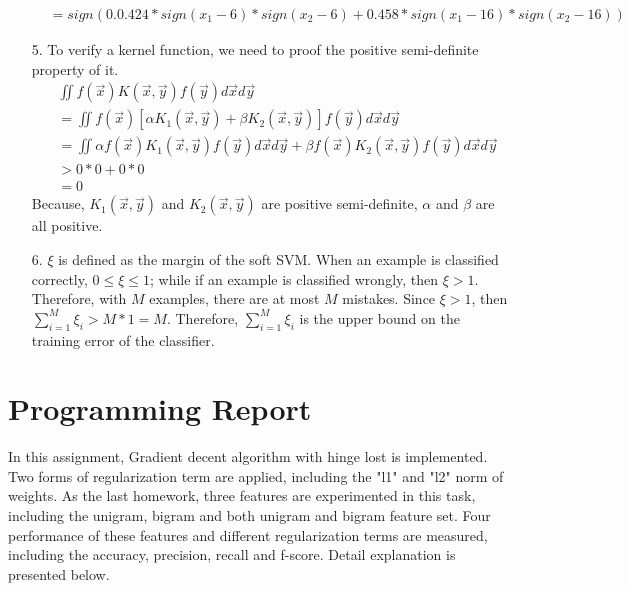 \documentclass[11pt]{article}
\begin{document}
\begin{itemize}
\begin{align*}
&= sign(0.0.424*sign(x_1-6)*sign(x_2-6) + 0.458*sign(x_1-16)*sign(x_2-16))
\end{align*}
\item[5.] To verify a kernel function, we need to proof the positive semi-definite property of it.
\begin{align*}
& \iint f(\vec{x})K(\vec{x},\vec{y})f(\vec{y})d\vec{x}d\vec{y} \\
& =\iint f(\vec{x})[\alpha K_1(\vec{x},\vec{y})+\beta K_2(\vec{x},\vec{y})]f(\vec{y})d\vec{x}d\vec{y} \\
& = \iint \alpha f(\vec{x})K_1(\vec{x},\vec{y})f(\vec{y})d\vec{x}d\vec{y} + \beta f(\vec{x})K_2(\vec{x},\vec{y})f(\vec{y})d\vec{x}d\vec{y} \\
& > 0*0 + 0*0 \\
& = 0
\end{align*}
Because, \(K_1(\vec{x},\vec{y})\) and \(K_2(\vec{x},\vec{y})\) are positive semi-definite, \(\alpha\) and \(\beta\) are all positive.
\item[6.] \(\xi\) is defined as the margin of the soft SVM. When an example is classified correctly, \(0 \leq \xi \leq 1\); while if an example is classified wrongly, then \(\xi > 1\). Therefore, with \(M\) examples, there are at most \(M\) mistakes. Since  \(\xi > 1\), then \(\sum_{i=1}^{M} \xi_i > M*1 = M\). Therefore, \(\sum_{i=1}^{M} \xi_i\) is the upper bound on the training error of the classifier.
\end{itemize}


\section{Programming Report}
In this assignment, Gradient decent algorithm with hinge lost is implemented. Two forms of regularization term are applied, including the "l1" and "l2" norm of weights. As the last homework, three features are experimented in this task, including the unigram, bigram and both unigram and bigram feature set. Four performance of these features and different regularization terms are measured, including the accuracy, precision, recall and f-score. Detail explanation is presented below.
\end{document}
